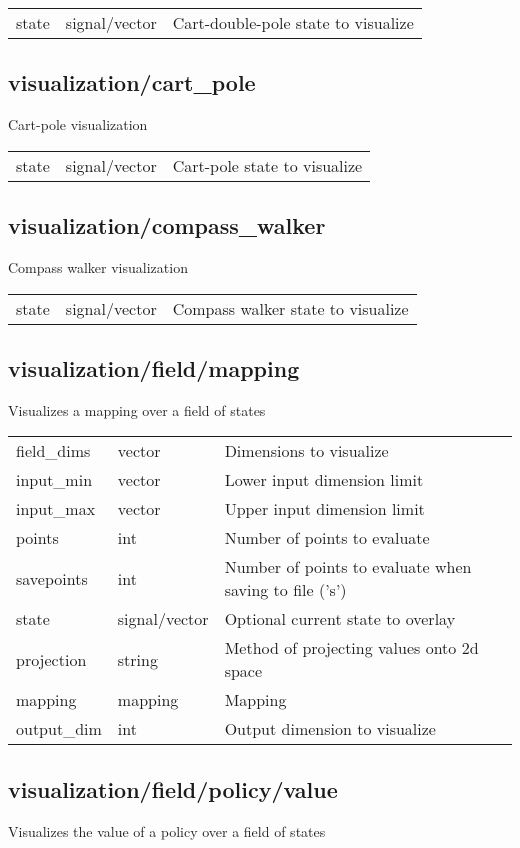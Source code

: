 \noindent\begin{tabular}{@{}lll@{}}
state&signal/vector&Cart-double-pole state to visualize\\
\end{tabular}
\subsection{visualization/cart\_pole}
\noindent Cart-pole visualization\\

\noindent\begin{tabular}{@{}lll@{}}
state&signal/vector&Cart-pole state to visualize\\
\end{tabular}
\subsection{visualization/compass\_walker}
\noindent Compass walker visualization\\

\noindent\begin{tabular}{@{}lll@{}}
state&signal/vector&Compass walker state to visualize\\
\end{tabular}
\subsection{visualization/field/mapping}
\noindent Visualizes a mapping over a field of states\\

\noindent\begin{tabular}{@{}lll@{}}
field\_dims&vector&Dimensions to visualize\\
input\_min&vector&Lower input dimension limit\\
input\_max&vector&Upper input dimension limit\\
points&int&Number of points to evaluate\\
savepoints&int&Number of points to evaluate when saving to file ('s')\\
state&signal/vector&Optional current state to overlay\\
projection&string&Method of projecting values onto 2d space\\
mapping&mapping&Mapping\\
output\_dim&int&Output dimension to visualize\\
\end{tabular}
\subsection{visualization/field/policy/value}
\noindent Visualizes the value of a policy over a field of states\\


